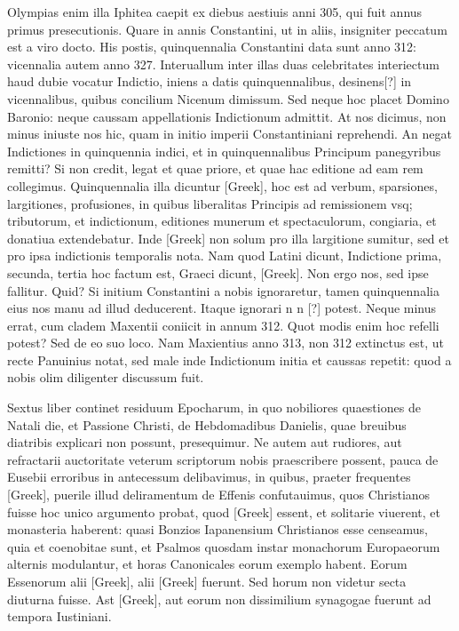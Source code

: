 Olympias enim illa Iphitea caepit ex diebus aestiuis
anni 305, qui fuit annus primus presecutionis.
Quare in annis
Constantini, ut in aliis, insigniter peccatum est a viro docto.
His
postis, quinquennalia Constantini data sunt anno 312: vicennalia
autem anno 327.
Interuallum inter illas duas celebritates interiectum
haud dubie vocatur Indictio, iniens a datis quinquennalibus,
desinens[?] in vicennalibus, quibus concilium Nicenum dimissum.
Sed neque hoc placet Domino Baronio: neque caussam appellationis
Indictionum admittit.
At nos dicimus, non minus iniuste nos
hic, quam in initio imperii Constantiniani reprehendi.
An negat
Indictiones in quinquennia indici, et in quinquennalibus Principum
panegyribus remitti?
Si non credit, legat et quae priore, et quae
hac editione ad eam rem collegimus.
Quinquennalia illa dicuntur
\textgreek{[Greek]}, hoc est ad verbum, sparsiones, largitiones, profusiones, in
quibus liberalitas Principis ad remissionem vsq; tributorum, et indictionum,
editiones munerum et spectaculorum, congiaria, et donatiua
extendebatur.
Inde \textgreek{[Greek]} non solum pro illa largitione
sumitur, sed et pro ipsa indictionis temporalis nota.
Nam quod Latini
dicunt, Indictione prima, secunda, tertia hoc factum est, Graeci
dicunt, \textgreek{[Greek]}.
Non ergo nos, sed ipse fallitur.
Quid?
Si initium Constantini a nobis ignoraretur, tamen quinquennalia
eius nos manu ad illud deducerent.
Itaque ignorari n n [?]
potest.
Neque minus errat, cum cladem Maxentii coniicit in annum
312.
Quot modis enim hoc refelli potest?
Sed de eo suo loco.
Nam
Maxientius anno 313, non 312 extinctus est, ut recte Panuinius notat,
sed male inde Indictionum initia et caussas repetit: quod a nobis
olim diligenter discussum fuit.

Sextus liber continet residuum Epocharum,
in quo nobiliores quaestiones de Natali die, et Passione Christi,
de Hebdomadibus Danielis, quae breuibus diatribis explicari
non possunt, presequimur.
Ne autem aut rudiores, aut refractarii auctoritate
veterum scriptorum nobis praescribere possent, pauca de
Eusebii erroribus in antecessum delibavimus, in quibus, praeter frequentes
\textgreek{[Greek]}, puerile illud deliramentum de Effenis confutauimus,
quos Christianos fuisse hoc unico argumento probat, quod
\textgreek{[Greek]} essent, et solitarie viuerent, et monasteria haberent:
quasi Bonzios
Iapanensium Christianos esse censeamus, quia et coenobitae sunt,
et Psalmos quosdam instar monachorum Europaeorum alternis modulantur,
et horas Canonicales eorum exemplo habent.
Eorum Essenorum alii \textgreek{[Greek]}, alii
 \textgreek{[Greek]} fuerunt.
Sed horum non videtur
secta diuturna fuisse.
Ast \textgreek{[Greek]}, aut eorum non dissimilium
synagogae fuerunt ad tempora Iustiniani.

